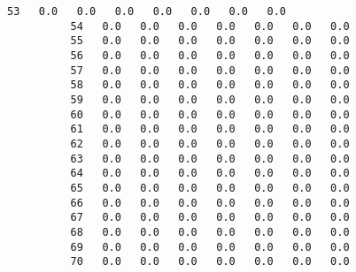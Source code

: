 \documentclass[11pt]{article}
\begin{document}
\begin{Verbatim}[commandchars=\\\{\}]
          53   0.0   0.0   0.0   0.0   0.0   0.0   0.0   
          54   0.0   0.0   0.0   0.0   0.0   0.0   0.0   
          55   0.0   0.0   0.0   0.0   0.0   0.0   0.0   
          56   0.0   0.0   0.0   0.0   0.0   0.0   0.0   
          57   0.0   0.0   0.0   0.0   0.0   0.0   0.0   
          58   0.0   0.0   0.0   0.0   0.0   0.0   0.0   
          59   0.0   0.0   0.0   0.0   0.0   0.0   0.0   
          60   0.0   0.0   0.0   0.0   0.0   0.0   0.0   
          61   0.0   0.0   0.0   0.0   0.0   0.0   0.0   
          62   0.0   0.0   0.0   0.0   0.0   0.0   0.0   
          63   0.0   0.0   0.0   0.0   0.0   0.0   0.0   
          64   0.0   0.0   0.0   0.0   0.0   0.0   0.0   
          65   0.0   0.0   0.0   0.0   0.0   0.0   0.0   
          66   0.0   0.0   0.0   0.0   0.0   0.0   0.0   
          67   0.0   0.0   0.0   0.0   0.0   0.0   0.0   
          68   0.0   0.0   0.0   0.0   0.0   0.0   0.0   
          69   0.0   0.0   0.0   0.0   0.0   0.0   0.0   
          70   0.0   0.0   0.0   0.0   0.0   0.0   0.0   
          

\end{Verbatim}
\end{document}
